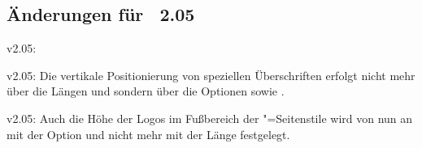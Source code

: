 \subsection{Änderungen für \TUDScript~2.05}
\begin{Obsolete}{v2.05:}{}
\begin{Obsolete}{v2.05:}{}
\printobsoletelist%
%
Die vertikale Positionierung von speziellen Überschriften erfolgt nicht mehr 
über die Längen  und  sondern 
über die Optionen  sowie .
\end{Obsolete}
\end{Obsolete}


\begin{Obsolete}{v2.05:}{}%
\printobsoletelist%
%
Auch die Höhe der Logos im Fußbereich der "=Seitenstile 
wird von nun an mit der Option  und nicht mehr mit der 
Länge  festgelegt.
\end{Obsolete}



